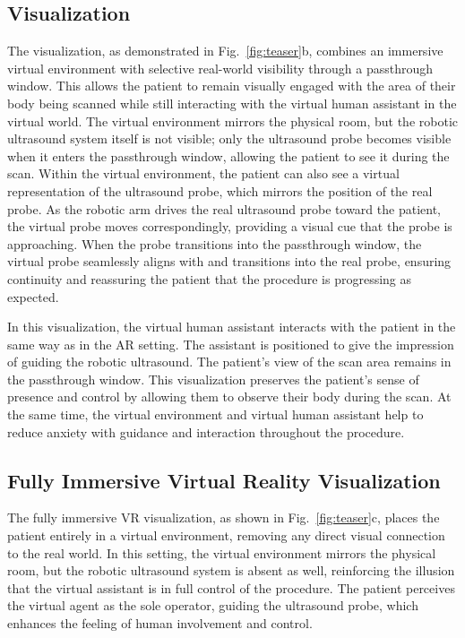 \subsection{ Visualization}

The  visualization, as demonstrated in Fig.~\ref{fig:teaser}b, combines an immersive virtual environment with selective real-world visibility through a passthrough window. This allows the patient to remain visually engaged with the area of their body being scanned while still interacting with the virtual human assistant in the virtual world. The virtual environment mirrors the physical room, but the robotic ultrasound system itself is not visible; only the ultrasound probe becomes visible when it enters the passthrough window, allowing the patient to see it during the scan.
Within the virtual environment, the patient can also see a virtual representation of the ultrasound probe, which mirrors the position of the real probe. As the robotic arm drives the real ultrasound probe toward the patient, the virtual probe moves correspondingly, providing a visual cue that the probe is approaching. When the probe transitions into the passthrough window, the virtual probe seamlessly aligns with and transitions into the real probe, ensuring continuity and reassuring the patient that the procedure is progressing as expected.

In this visualization, the virtual human assistant interacts with the patient in the same way as in the AR setting. The assistant is positioned to give the impression of guiding the robotic ultrasound. The patient’s view of the scan area remains in the passthrough window.
This visualization preserves the patient’s sense of presence and control by allowing them to observe their body during the scan. At the same time, the virtual environment and virtual human assistant help to reduce anxiety with guidance and interaction throughout the procedure.

\subsection{Fully Immersive Virtual Reality Visualization}

The fully immersive VR visualization, as shown in Fig.~\ref{fig:teaser}c, places the patient entirely in a virtual environment, removing any direct visual connection to the real world. In this setting, the virtual environment mirrors the physical room, but the robotic ultrasound system is absent as well, reinforcing the illusion that the virtual assistant is in full control of the procedure. The patient perceives the virtual agent as the sole operator, guiding the ultrasound probe, which enhances the feeling of human involvement and control.

